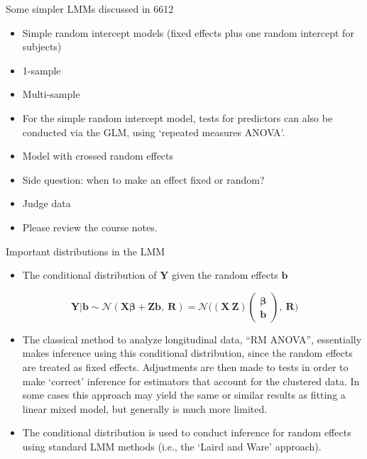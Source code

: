 \documentclass[
  9pt,
  ignorenonframetext,
]{beamer}
\providecommand{\tightlist}{%
  \setlength{\itemsep}{0pt}\setlength{\parskip}{0pt}}
\begin{document}
\begin{frame}{Some simpler LMMs discussed in 6612}
\protect\hypertarget{some-simpler-lmms-discussed-in-6612}{}
\begin{itemize}
\item
  Simple random intercept models (fixed effects plus one random
  intercept for subjects)
\item
  1-sample
\item
  Multi-sample
\item
  For the simple random intercept model, tests for predictors can also
  be conducted via the GLM, using `repeated measures ANOVA'.
\item
  Model with crossed random effects
\item
  Side question: when to make an effect fixed or random?
\item
  Judge data
\item
  Please review the course notes.
\end{itemize}
\end{frame}

\begin{frame}{Important distributions in the LMM}
\protect\hypertarget{important-distributions-in-the-lmm}{}
\begin{itemize}
\tightlist
\item
  The conditional distribution of \(\pmb Y\) given the random effects
  \(\pmb b\)
\end{itemize}

\[
\pmb{Y|b} \sim\mathcal N (\pmb {X\beta} + \pmb {Zb},\ \pmb R) 
= \mathcal N\Big((\pmb X\ \pmb Z) 
\begin{pmatrix}
\pmb \beta\\ \pmb b
\end{pmatrix},\ \pmb R
\Big)
\]

\begin{itemize}
\item
  The classical method to analyze longitudinal data, ``RM ANOVA'',
  essentially makes inference using this conditional distribution, since
  the random effects are treated as fixed effects. Adjustments are then
  made to tests in order to make `correct' inference for estimators that
  account for the clustered data. In some cases this approach may yield
  the same or similar results as fitting a linear mixed model, but
  generally is much more limited.
\item
  The conditional distribution is used to conduct inference for random
  effects using standard LMM methods (i.e., the `Laird and Ware'
  approach).
\end{itemize}
\end{frame}
\end{document}
